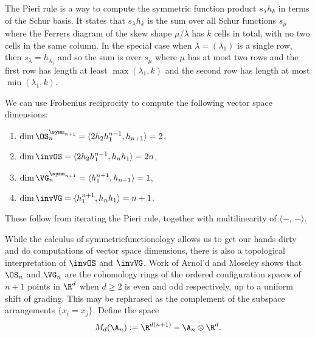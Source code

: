 \documentclass{amsart}
\begin{document}
The Pieri rule is a way to compute the symmetric function product $s_\lambda h_k$ in terms of the Schur basis.
It states that $s_\lambda h_k$ is the sum over all Schur functions $s_\mu$ where the Ferrers diagram of the skew shape $\mu/\lambda$ has $k$ cells in total, with no two cells in the same column.
In the special case when $\lambda = (\lambda_1)$ is a single row, then $s_\lambda = h_{\lambda_1}$ and so the sum is over $s_\mu$ where $\mu$ has at most two rows and the first row has length at least $\max(\lambda_1, k)$ and the second row has length at most $\min(\lambda_1,k)$.

\begin{example}\label{ex:TotalDims}
We can use Frobenius reciprocity to compute the following vector space dimensions:
\begin{enumerate}
    \item $\dim \OS_n^{\symm_{n+1}} = \langle 2h_2h_1^{n-1}, h_{n+1}\rangle = 2$,
    \item $\dim \invOS = \langle 2h_2h_1^{n-1}, h_nh_1\rangle = 2n$,
    \item $\dim \VG_n^{\symm_{n+1}} = \langle h_1^{n+1}, h_{n+1}\rangle = 1$,
    \item $\dim \invVG = \langle h_1^{n+1},h_nh_1\rangle = n+1$.
\end{enumerate}
These follow from iterating the Pieri rule, together with multilinearity of $\langle -,\, - \rangle$.
\end{example}

While the calculus of symmetricfunctionology allows us to get our hands dirty and do computations of vector space dimensions, there is also a topological interpretation of $\invOS$ and $\invVG$.
Work of Arnol'd \cite{arnold} and Moseley \cite{moseley} shows that $\OS_n$ and $\VG_n$ are the cohomology rings of the ordered configuration spaces of $n+1$ points in $\R^d$ when $d\geq 2$ is even and odd respectively, up to a uniform shift of grading.
This may be rephrased as the complement of the subspace arrangements $\{x_i = x_j\}$.
Define the space 
\[M_d(\A_n) := \R^{d(n+1)} - \A_n \otimes \R^d.\]
\end{document}
